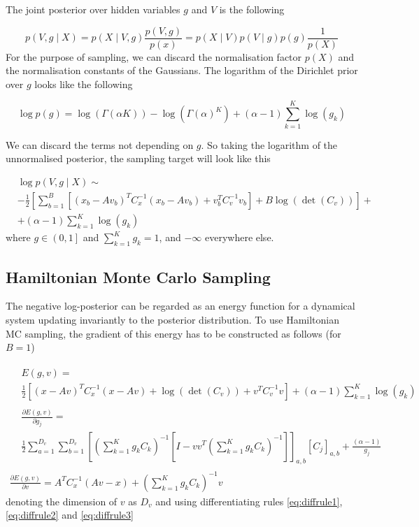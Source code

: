 \documentclass{paper}
\begin{document}
The joint posterior over hidden variables $g$ and $V$ is the following

\begin{equation}
p(V,g \mid X) = p(X \mid V,g) \frac{p(V,g)}{p(x)} = p(X \mid V) p(V \mid g) p(g)\frac{1}{p(X)}
\end{equation}
%
For the purpose of sampling, we can discard the normalisation factor $p(X)$ and the normalisation constants of the Gaussians. The logarithm of the Dirichlet prior over $g$ looks like the following 

\begin{equation}
\log p(g) = \log(\Gamma(\alpha K)) - \log(\Gamma(\alpha)^K) + (\alpha-1) \sum_{k=1}^K \log(g_k)
\end{equation}

%
We can discard the terms not depending on $g$. So taking the logarithm of the unnormalised posterior, the sampling target will look like this

\begin{equation}
\begin{split}
&\log p(V,g \mid X) \sim \\ 
&-\frac{1}{2} \left[\sum_{b=1}^B \left[(x_b-Av_b)^T C_x^{-1} (x_b-Av_b) + v_b^T C_v^{-1} v_b \right] + B \log(\det(C_v)) \right] + \\
&+ (\alpha-1) \sum_{k=1}^K \log(g_k) \label{eq:log_post}
\end{split}
\end{equation}
%
where $g \in \left(0,1 \right]$ and $\sum_{k=1}^{K} g_k = 1$, and $-\infty$ everywhere else. 

\subsection{Hamiltonian Monte Carlo Sampling}

The negative log-posterior can be regarded as an energy function for a dynamical system updating invariantly to the posterior distribution. To use Hamiltonian MC sampling, the gradient of this energy has to be constructed as follows (for $B=1$)

\begin{eqnarray}
\begin{split}
&E(g,v) = \\
&\frac{1}{2} \left[(x-Av)^T C_x^{-1} (x-Av) + \log(\det(C_v)) + v^T C_v^{-1} v\right] + (\alpha-1) \sum_{k=1}^K \log(g_k)
\end{split}\\
\begin{split}
&\frac{\partial E(g,v)}{\partial g_j} = \\
&\frac{1}{2} \sum_{a=1}^{D_v} \sum_{b=1}^{D_v} \left[ \left( \sum_{k=1}^K g_k C_k \right)^{-1} \left[ I - vv^T \left( \sum_{k=1}^K g_k C_k \right)^{-1} \right] \right]_{a,b} \left[ C_j \right]_{a,b} + \frac{(\alpha-1)}{g_j}
\end{split}\\
\frac{\partial E(g,v)}{\partial v} = A^T C_x^{-1}(Av-x) + \left( \sum_{k=1}^K g_k C_k \right)^{-1} v
\end{eqnarray}
%
denoting the dimension of $v$ as $D_v$ and using differentiating rules \ref{eq:diffrule1}, \ref{eq:diffrule2} and \ref{eq:diffrule3}
\end{document}
